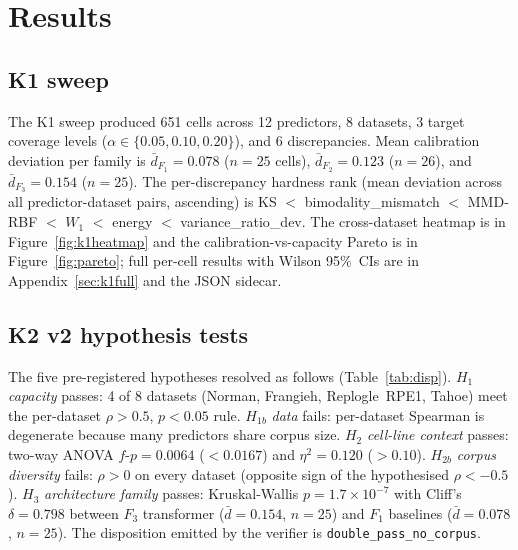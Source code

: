 \documentclass[11pt]{article}
\begin{document}
\section{Results}
\label{sec:results}

\subsection{K1 sweep}
\label{sec:k1}
The K1 sweep produced 651 cells across 12 predictors, 8 datasets, 3
target coverage levels ($\alpha \in \{0.05, 0.10, 0.20\}$), and 6
discrepancies. Mean calibration deviation per family is
$\bar d_{F_1} = 0.078$ ($n = 25$ cells), $\bar d_{F_2} = 0.123$
($n = 26$), and $\bar d_{F_3} = 0.154$ ($n = 25$). The
per-discrepancy hardness rank (mean deviation across all
predictor-dataset pairs, ascending) is KS $<$ bimodality\_mismatch $<$
MMD-RBF $<$ $W_1$ $<$ energy $<$ variance\_ratio\_dev. The cross-dataset
heatmap is in Figure~\ref{fig:k1heatmap} and the
calibration-vs-capacity Pareto is in Figure~\ref{fig:pareto}; full
per-cell results with Wilson 95\%~CIs are in Appendix~\ref{sec:k1full}
and the JSON sidecar.

\subsection{K2 v2 hypothesis tests}
\label{sec:k2v2}
The five pre-registered hypotheses resolved as follows
(Table~\ref{tab:disp}).
$H_1$ \emph{capacity} passes: 4 of 8 datasets (Norman, Frangieh,
Replogle~RPE1, Tahoe) meet the per-dataset $\rho > 0.5$, $p < 0.05$
rule. $H_{1b}$ \emph{data} fails: per-dataset Spearman is degenerate
because many predictors share corpus size. $H_2$ \emph{cell-line
context} passes: two-way ANOVA $f$-$p = 0.0064$ ($< 0.0167$) and
$\eta^2 = 0.120$ ($> 0.10$). $H_{2b}$ \emph{corpus diversity} fails:
$\rho > 0$ on every dataset (opposite sign of the hypothesised
$\rho < -0.5$). $H_3$ \emph{architecture family} passes: Kruskal-Wallis
$p = 1.7 \times 10^{-7}$ with Cliff's $\delta = 0.798$ between $F_3$
transformer ($\bar d = 0.154$, $n = 25$) and $F_1$ baselines
($\bar d = 0.078$, $n = 25$). The disposition emitted by the verifier
is \texttt{double\_pass\_no\_corpus}.
\end{document}
